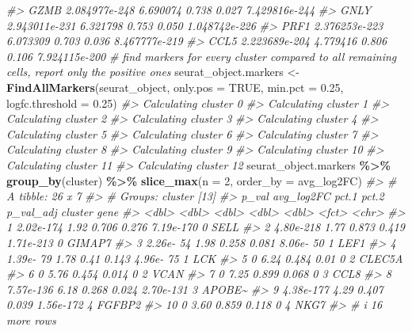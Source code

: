 \documentclass[
]{book}
\newenvironment{Shaded}{\begin{snugshade}}{\end{snugshade}}
\newcommand{\AttributeTok}[1]{\textcolor[rgb]{0.13,0.29,0.53}{#1}}
\newcommand{\CommentTok}[1]{\textcolor[rgb]{0.56,0.35,0.01}{\textit{#1}}}
\newcommand{\ConstantTok}[1]{\textcolor[rgb]{0.56,0.35,0.01}{#1}}
\newcommand{\DecValTok}[1]{\textcolor[rgb]{0.00,0.00,0.81}{#1}}
\newcommand{\FloatTok}[1]{\textcolor[rgb]{0.00,0.00,0.81}{#1}}
\newcommand{\FunctionTok}[1]{\textcolor[rgb]{0.13,0.29,0.53}{\textbf{#1}}}
\newcommand{\NormalTok}[1]{#1}
\newcommand{\OtherTok}[1]{\textcolor[rgb]{0.56,0.35,0.01}{#1}}
\newcommand{\SpecialCharTok}[1]{\textcolor[rgb]{0.81,0.36,0.00}{\textbf{#1}}}
\begin{document}
\begin{Shaded}
\begin{Highlighting}[]
\CommentTok{\#\textgreater{} GZMB 2.084977e{-}248   6.690074 0.738 0.027 7.429816e{-}244}
\CommentTok{\#\textgreater{} GNLY 2.943011e{-}231   6.321798 0.753 0.050 1.048742e{-}226}
\CommentTok{\#\textgreater{} PRF1 2.376253e{-}223   6.073309 0.703 0.036 8.467777e{-}219}
\CommentTok{\#\textgreater{} CCL5 2.223689e{-}204   4.779416 0.806 0.106 7.924115e{-}200}
\CommentTok{\# find markers for every cluster compared to all remaining cells, report only the positive ones}
\NormalTok{seurat\_object.markers }\OtherTok{\textless{}{-}} \FunctionTok{FindAllMarkers}\NormalTok{(seurat\_object, }\AttributeTok{only.pos =} \ConstantTok{TRUE}\NormalTok{, }\AttributeTok{min.pct =} \FloatTok{0.25}\NormalTok{, }\AttributeTok{logfc.threshold =} \FloatTok{0.25}\NormalTok{)}
\CommentTok{\#\textgreater{} Calculating cluster 0}
\CommentTok{\#\textgreater{} Calculating cluster 1}
\CommentTok{\#\textgreater{} Calculating cluster 2}
\CommentTok{\#\textgreater{} Calculating cluster 3}
\CommentTok{\#\textgreater{} Calculating cluster 4}
\CommentTok{\#\textgreater{} Calculating cluster 5}
\CommentTok{\#\textgreater{} Calculating cluster 6}
\CommentTok{\#\textgreater{} Calculating cluster 7}
\CommentTok{\#\textgreater{} Calculating cluster 8}
\CommentTok{\#\textgreater{} Calculating cluster 9}
\CommentTok{\#\textgreater{} Calculating cluster 10}
\CommentTok{\#\textgreater{} Calculating cluster 11}
\CommentTok{\#\textgreater{} Calculating cluster 12}
\NormalTok{seurat\_object.markers }\SpecialCharTok{\%\textgreater{}\%} \FunctionTok{group\_by}\NormalTok{(cluster) }\SpecialCharTok{\%\textgreater{}\%} \FunctionTok{slice\_max}\NormalTok{(}\AttributeTok{n =} \DecValTok{2}\NormalTok{, }\AttributeTok{order\_by =}\NormalTok{ avg\_log2FC)}
\CommentTok{\#\textgreater{} \# A tibble: 26 x 7}
\CommentTok{\#\textgreater{} \# Groups:   cluster [13]}
\CommentTok{\#\textgreater{}        p\_val avg\_log2FC pct.1 pct.2 p\_val\_adj cluster gene  }
\CommentTok{\#\textgreater{}        \textless{}dbl\textgreater{}      \textless{}dbl\textgreater{} \textless{}dbl\textgreater{} \textless{}dbl\textgreater{}     \textless{}dbl\textgreater{} \textless{}fct\textgreater{}   \textless{}chr\textgreater{} }
\CommentTok{\#\textgreater{}  1 2.02e{-}174       1.92 0.706 0.276 7.19e{-}170 0       SELL  }
\CommentTok{\#\textgreater{}  2 4.80e{-}218       1.77 0.873 0.419 1.71e{-}213 0       GIMAP7}
\CommentTok{\#\textgreater{}  3 2.26e{-} 54       1.98 0.258 0.081 8.06e{-} 50 1       LEF1  }
\CommentTok{\#\textgreater{}  4 1.39e{-} 79       1.78 0.41  0.143 4.96e{-} 75 1       LCK   }
\CommentTok{\#\textgreater{}  5 0               6.24 0.484 0.01  0         2       CLEC5A}
\CommentTok{\#\textgreater{}  6 0               5.76 0.454 0.014 0         2       VCAN  }
\CommentTok{\#\textgreater{}  7 0               7.25 0.899 0.068 0         3       CCL8  }
\CommentTok{\#\textgreater{}  8 7.57e{-}136       6.18 0.268 0.024 2.70e{-}131 3       APOBE\textasciitilde{}}
\CommentTok{\#\textgreater{}  9 4.38e{-}177       4.29 0.407 0.039 1.56e{-}172 4       FGFBP2}
\CommentTok{\#\textgreater{} 10 0               3.60 0.859 0.118 0         4       NKG7  }
\CommentTok{\#\textgreater{} \# i 16 more rows}
\end{Highlighting}
\end{Shaded}
\end{document}
